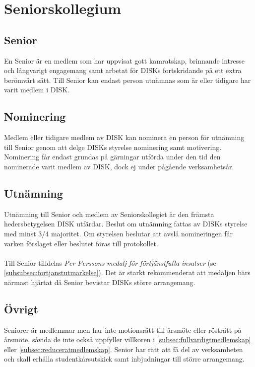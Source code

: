 \clearpage
\section{Seniorskollegium}
\label{sec:seniorskollegium}

	\subsection{Senior}
	\label{subsec:senior}
		En Senior är en medlem som har uppvisat gott kamratskap, brinnande intresse och långvarigt engagemang samt arbetat för DISKs fortskridande på ett extra berömvärt sätt. Till Senior kan endast person utnämnas som är eller tidigare har varit medlem i DISK.

	\subsection{Nominering}
	\label{subsec:nominering}
		Medlem eller tidigare medlem av DISK kan nominera en person för utnämning till Senior genom att delge DISKs styrelse nominering samt motivering. Nominering får endast grundas på gärningar utförda under den tid den nominerade varit medlem av DISK, dock ej under pågående verksamhetsår.

	\subsection{Utnämning}
	\label{subsec:utnamning}
		Utnämning till Senior och medlem av Seniorskollegiet är den främsta hedersbetygelsen DISK utfärdar. Beslut om utnämning fattas av DISKs styrelse med minst 3/4 majoritet. Om styrelsen beslutar att avslå nomineringen får varken förslaget eller beslutet föras till protokollet.\\ \\
		Till Senior tilldelas \emph{Per Perssons medalj för förtjänstfulla insatser} (se \ref{subsubsec:fortjanstutmarkelse}). Det är starkt rekommenderat att medaljen bärs närmast hjärtat då Senior bevistar DISKs större arrangemang.

	\subsection{Övrigt}
	\label{subsec:ovrigt}
		Seniorer är medlemmar men har inte motionsrätt till årsmöte eller rösträtt på årsmöte, såvida de inte också uppfyller villkoren i \ref{subsec:fullvardigtmedlemskap} eller \ref{subsec:reduceratmedlemskap}. Senior har rätt att få del av verksamheten och skall erhålla studentkårsutskick samt inbjudningar till större arrangemang.

